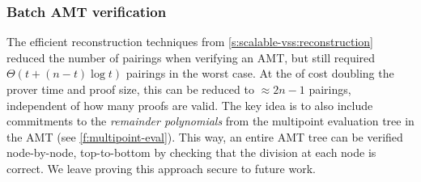 \subsubsection{Batch AMT verification}
\label{s:amt:batch-verification}
The efficient reconstruction techniques from \cref{s:scalable-vss:reconstruction} reduced the number of pairings when verifying an AMT, but still required $\Theta(t + (n-t)\log{t})$ pairings in the worst case.
At the of cost doubling the prover time and proof size, this can be reduced to $\approx 2n-1$ pairings, independent of how many proofs are valid.
The key idea is to also include commitments to the \textit{remainder polynomials} from the multipoint evaluation tree in the AMT (see \cref{f:multipoint-eval}).
This way, an entire AMT tree can be verified node-by-node, top-to-bottom by checking that the division at each node is correct.
We leave proving this approach secure to future work.
